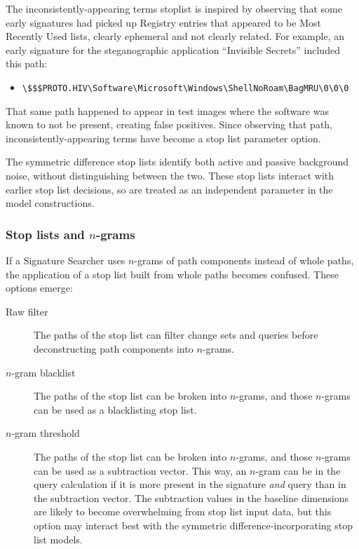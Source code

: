 \documentclass[11pt]{ucthesis}
\theoremstyle{plain}
\theoremstyle{definition}
\newcommand{\breakingbackslash}{\textbackslash\allowbreak{}}
\begin{document}
The inconsistently-appearing terms stoplist is inspired by observing that some early signatures had picked up Registry entries that appeared to be Most Recently Used lists, clearly ephemeral and not clearly related.  For example, an early signature for the steganographic application ``Invisible Secrets'' included this path:

\begin{itemize}
\item \texttt{{\breakingbackslash}\$\$\$PROTO.HIV{\breakingbackslash}Software{\breakingbackslash}Microsoft{\breakingbackslash}Windows{\breakingbackslash}ShellNoRoam{\breakingbackslash}BagMRU{\breakingbackslash}0{\breakingbackslash}0{\breakingbackslash}0}
\end{itemize}

That same path happened to appear in test images where the software was known to not be present, creating false positives.  Since observing that path, inconsistently-appearing terms have become a stop list parameter option.

The symmetric difference stop lists identify both active and passive background noise, without distinguishing between the two.  These stop lists interact with earlier stop list decisions, so are treated as an independent parameter in the model constructions.


\subsubsection{Stop lists and $n$-grams}
\label{sec:stoplistngram}

If a Signature Searcher uses $n$-grams of path components instead of whole paths, the application of a stop list built from whole paths becomes confused.  These options emerge:

\begin{description}
\item[Raw filter] The paths of the stop list can filter change sets and queries before deconstructing path components into $n$-grams.
\item[$n$-gram blacklist] The paths of the stop list can be broken into $n$-grams, and those $n$-grams can be used as a blacklisting stop list.
\item[$n$-gram threshold] The paths of the stop list can be broken into $n$-grams, and those $n$-grams can be used as a subtraction vector.  This way, an $n$-gram can be in the query calculation if it is more present in the signature \emph{and} query than in the subtraction vector.  The subtraction values in the baseline dimensions are likely to become overwhelming from stop list input data, but this option may interact best with the symmetric difference-incorporating stop list models.
\end{description}
\end{document}
